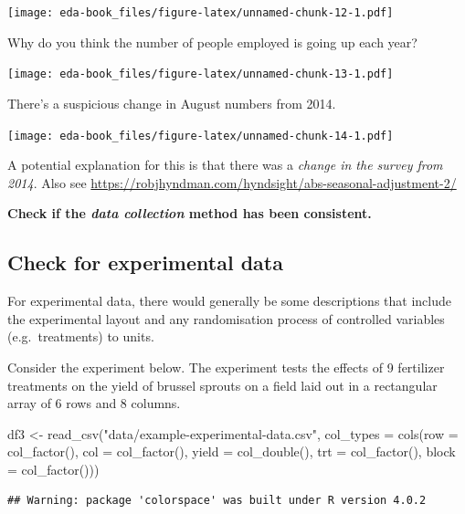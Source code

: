 \documentclass[
]{book}
\newenvironment{Shaded}{\begin{snugshade}}{\end{snugshade}}
\newcommand{\AttributeTok}[1]{\textcolor[rgb]{0.77,0.63,0.00}{#1}}
\newcommand{\FunctionTok}[1]{\textcolor[rgb]{0.00,0.00,0.00}{#1}}
\newcommand{\NormalTok}[1]{#1}
\newcommand{\OtherTok}[1]{\textcolor[rgb]{0.56,0.35,0.01}{#1}}
\newcommand{\StringTok}[1]{\textcolor[rgb]{0.31,0.60,0.02}{#1}}
\begin{document}
\texttt{[image: eda-book\_files/figure-latex/unnamed-chunk-12-1.pdf]}

Why do you think the number of people employed is going up each year?

\texttt{[image: eda-book\_files/figure-latex/unnamed-chunk-13-1.pdf]}

There's a suspicious change in August numbers from 2014.

\texttt{[image: eda-book\_files/figure-latex/unnamed-chunk-14-1.pdf]}

A potential explanation for this is that there was a \emph{change in the survey from 2014}. Also see \url{https://robjhyndman.com/hyndsight/abs-seasonal-adjustment-2/}

\textbf{Check if the \emph{data collection} method has been consistent.}

\hypertarget{check-for-experimental-data}{%
\subsection{Check for experimental data}\label{check-for-experimental-data}}

For experimental data, there would generally be some descriptions that include the experimental layout and any randomisation process of controlled variables (e.g.~treatments) to units.

Consider the experiment below. The experiment tests the effects of 9 fertilizer treatments on the yield of brussel sprouts on a field laid out in a rectangular array of 6 rows and 8 columns.

\begin{Shaded}
\begin{Highlighting}[]
\NormalTok{df3 }\OtherTok{\textless{}{-}} \FunctionTok{read\_csv}\NormalTok{(}\StringTok{"data/example{-}experimental{-}data.csv"}\NormalTok{, }
                \AttributeTok{col\_types =} \FunctionTok{cols}\NormalTok{(}\AttributeTok{row =} \FunctionTok{col\_factor}\NormalTok{(),}
                                 \AttributeTok{col =} \FunctionTok{col\_factor}\NormalTok{(),}
                                 \AttributeTok{yield =} \FunctionTok{col\_double}\NormalTok{(),}
                                 \AttributeTok{trt =} \FunctionTok{col\_factor}\NormalTok{(),}
                                 \AttributeTok{block =} \FunctionTok{col\_factor}\NormalTok{()))}
\end{Highlighting}
\end{Shaded}

\begin{verbatim}
## Warning: package 'colorspace' was built under R version 4.0.2
\end{verbatim}
\end{document}
